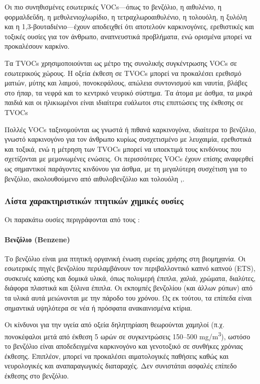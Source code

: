 Οι πιο συνηθισμένες εσωτερικές VOCs—όπως το βενζόλιο, η αιθυλένιο, η φορμαλδεΰδη, η μεθυλενιοχλωρίδιο, η τετραχλωροαιθυλένιο, η τολουόλη, η ξυλόλη και η 1,3-βουταδιένιο—έχουν αποδειχθεί ότι αποτελούν καρκινογόνες, 
ερεθιστικές και τοξικές ουσίες για τον άνθρωπο, αναπνευστικά προβλήματα, ενώ ορισμένα μπορεί να προκαλέσουν καρκίνο.  

Τα TVOCs χρησιμοποιούνται ως μέτρο της συνολικής συγκέντρωσης VOCs σε εσωτερικούς χώρους. 
Η οξεία έκθεση σε TVOCs μπορεί να προκαλέσει ερεθισμό ματιών, μύτης και λαιμού, πονοκεφάλους, απώλεια συντονισμού και ναυτία, βλάβες στο ήπαρ, τα νεφρά και το κεντρικό νευρικό σύστημα.
 Τα άτομα με άσθμα, τα μικρά παιδιά και οι ηλικιωμένοι είναι ιδιαίτερα ευάλωτοι στις επιπτώσεις της έκθεσης σε TVOCs

Πολλές VOCs ταξινομούνται ως γνωστά ή πιθανά καρκινογόνα, ιδιαίτερα το βενζόλιο, γνωστό καρκινογόνο για τον άνθρωπο κυρίως συσχετισμένο με λευχαιμία, ερεθιστικά και τοξικά, ενώ η μέτρηση των TVOCs μπορεί να υποεκτιμά τους κινδύνους που σχετίζονται με μεμονωμένες ενώσεις.
Οι περισσότερες VOCs έχουν επίσης αναφερθεί ως σημαντικοί παράγοντες κινδύνου για άσθμα, με τη μεγαλύτερη συσχέτιση για το βενζόλιο, ακολουθούμενο από αιθυλοβενζόλιο και τολουόλη \cite{ijerph17238972},\cite{su12219045}.


\subsubsection{Λίστα χαρακτηριστικών πτητικών χημικές ουσίες}

Οι παρακάτω ουσίες περιγράφονται από τους \cite{GONZALEZMARTIN2021128376}:

\paragraph{Βενζόλιο (Benzene)}

Το βενζόλιο είναι μια πτητική οργανική ένωση ευρείας χρήσης στη βιομηχανία. Οι εσωτερικές πηγές βενζολίου περιλαμβάνουν τον περιβαλλοντικό καπνό καπνού (ETS), συσκευές καύσης και δομικά υλικά, όπως πολυμερή έπιπλα, χαλιά, χρώματα, διαλύτες, 
διάφορα πλαστικά και ξύλινα έπιπλα.
Οι εκπομπές βενζολίου (και άλλων ρύπων) από τα υλικά αυτά μειώνονται με την πάροδο του χρόνου. 
Ως εκ τούτου, τα επίπεδα είναι σημαντικά υψηλότερα σε νέα ή πρόσφατα ανακαινισμένα κτίρια.

Οι κίνδυνοι για την υγεία από οξεία δηλητηρίαση θεωρούνται χαμηλοί (π.χ. πονοκέφαλοι μετά από έκθεση 5 ωρών σε συγκεντρώσεις 150–500 mg/m\textsuperscript{3}),
ωστόσο το βενζόλιο είναι αποδεδειγμένα καρκινογόνο και γενοτοξικό σε συνθήκες χρόνιας έκθεσης. Επιπλέον, μπορεί να προκαλέσει αιματολογικές παθήσεις καθώς και νευρολογικές και αναπαραγωγικές διαταραχές. Δεν συνιστάται ασφαλές επίπεδο έκθεσης στο βενζόλιο.

